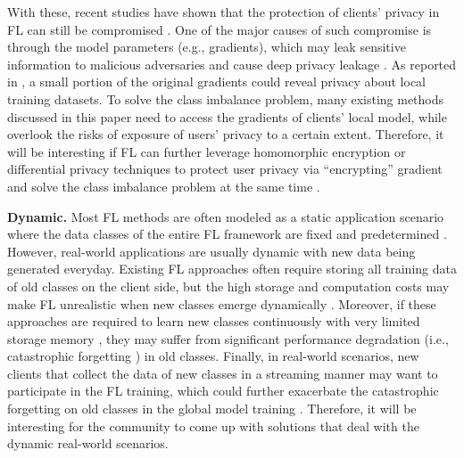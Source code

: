 \documentclass[10pt,journal,compsoc]{IEEEtran}
\begin{document}
With these, recent studies have shown that the protection of clients' privacy in FL can still be compromised \cite{geiping2020inverting}. One of the major causes of such compromise is through the model parameters (e.g., gradients), which may leak sensitive information to malicious adversaries and cause deep privacy leakage \cite{bhowmick2018protection} \cite{zhu2019deep}. As reported in \cite{aono2017privacy}, a small portion of the original gradients could reveal privacy about local training datasets. To solve the class imbalance problem, many existing methods discussed in this paper need to access the gradients of clients' local model, while overlook the risks of exposure of users' privacy to a certain extent. Therefore, it will be interesting if FL can further leverage homomorphic encryption or differential privacy techniques to protect user privacy via ``encrypting'' gradient and solve the class imbalance problem at the same time \cite{hahn2019privacy} \cite{yin2021comprehensive} \cite{mothukuri2021survey} \cite{aono2017privacy}. 

\textbf{Dynamic.}
Most FL methods are often modeled as a static application scenario where the data classes of the entire FL framework are fixed and predetermined \cite{dong2022federated}. However, real-world applications are usually dynamic with new data being generated everyday. Existing FL approaches often require storing all training data of old classes on the client side, but the high storage and computation costs may make FL unrealistic when new classes emerge dynamically \cite{nguyen2018crowdsourced} \cite{wang2021non} \cite{yang2021flop}. Moreover, if these approaches are required to learn new classes continuously with very limited storage memory \cite{shoham2019overcoming} \cite{yang2021flop}, they may suffer from significant performance degradation (i.e., catastrophic forgetting \cite{kirkpatrick2017overcoming} \cite{rebuffi2017icarl} \cite{shin2017continual}) in old classes. Finally, in real-world scenarios, new clients that collect the data of new classes in a streaming manner may want to participate in the FL training, which could further exacerbate the catastrophic forgetting on old classes in the global model training \cite{dong2022federated}. Therefore, it will be interesting for the community to come up with solutions that deal with the dynamic real-world scenarios.
\end{document}
